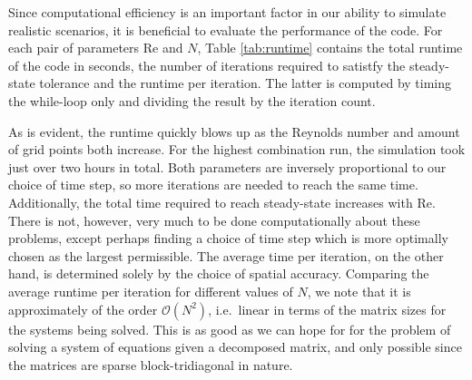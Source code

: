 \documentclass[final,3p,twocolumn]{elsarticle}
\begin{document}
Since computational efficiency is an important factor in our ability to
simulate realistic scenarios, it is beneficial to evaluate the performance of
the code. For each pair of parameters Re and $N$, Table \ref{tab:runtime}
contains the total runtime of the code in seconds, the number of iterations required to
satistfy the steady-state tolerance and the runtime per iteration. The latter
is computed by timing the while-loop only and dividing the result by the
iteration count. 

As is evident, the runtime quickly blows up as the Reynolds number and amount
of grid points both increase. For the highest combination run, the simulation
took just over two hours in total. Both parameters are inversely proportional to our
choice of time step, so more iterations are needed to reach the same time.
Additionally, the total time required to reach steady-state increases with Re.
There is not, however, very much to be done computationally about these
problems, except perhaps finding a choice of time step which is more optimally
chosen as the largest permissible. The average time per iteration, on the other
hand, is determined solely by the choice of spatial accuracy. Comparing the
average runtime per iteration for different values of $N$, we note that it is
approximately of the order $\mathcal{O}(N^2)$, i.e.\ linear in terms of the
matrix sizes for the systems being solved. This is as good as we can hope for
for the problem of solving a system of equations given a decomposed matrix, and
only possible since the matrices are sparse block-tridiagonal in nature. 
\end{document}
